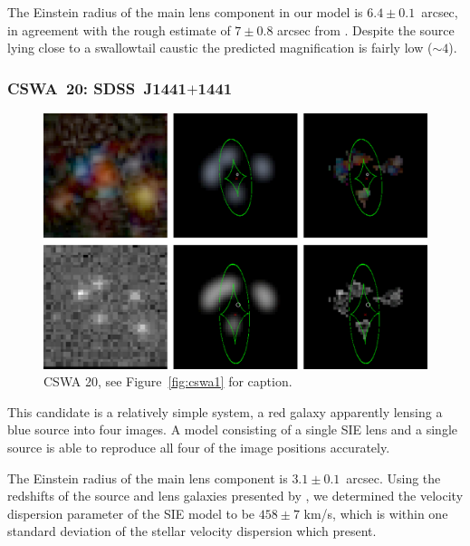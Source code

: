 \documentclass[iop]{emulateapj}
\begin{document}
The Einstein radius of the main lens component in our model is $6.4\pm0.1$~arcsec, 
in agreement with the rough estimate of $7\pm0.8$ arcsec from \citet{Die++09}. 
Despite the source lying close to a swallowtail caustic the predicted magnification is fairly low 
($\sim 4$).



\subsubsection*{CSWA~20: SDSS\ J1441$+$1441}
\label{sec:results:indinotes:cswa20}


\begin{figure}[!ht]
	\centering\includegraphics[width=\linewidth]{figs/20.eps}
	\caption{CSWA 20, see Figure~\ref{fig:cswa1} for caption.}
	\label{fig:cswa20}
\end{figure}

This candidate is a relatively simple system, a red galaxy apparently lensing a
blue source into four images. A model consisting of a single SIE lens and a
single source is able to reproduce all four of the image positions accurately.

The Einstein radius of the main lens component is $3.1 \pm 0.1$~arcsec. Using
the redshifts of the source and lens galaxies presented by \citeauthor{Pet++10},
we determined the velocity dispersion parameter of the SIE model to be $458 \pm
7$ km/s, which is within one standard deviation of the stellar velocity
dispersion which \citet{Pet++10} present.
\end{document}
